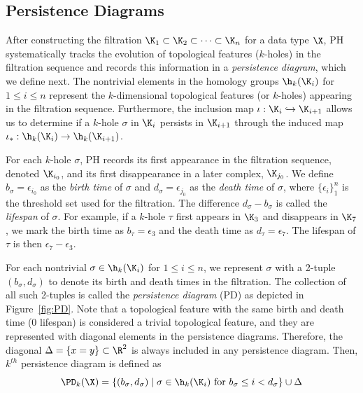  

\subsection{Persistence Diagrams} \label{sec:PD}

 
After constructing the filtration $\K_1 \subset \K_2 \subset \dots \subset \K_n$ for a data type $\X$, PH systematically tracks the evolution of topological features ($k$-holes) in the filtration sequence and records this information in a \textit{persistence diagram}, which we define next. The nontrivial elements in the homology groups $\h_k(\K_i)$ for $1\leq i\leq n$ represent the $k$-dimensional topological features (or $k$-holes) appearing in the filtration sequence. Furthermore, the inclusion map $\iota: \K_i \hookrightarrow \K_{i+1}$ allows us to determine if a $k$-hole $\sigma$ in $\K_i$ persists in $\K_{i+1}$ through the induced map $\iota_*: \h_k(\K_i) \to \h_k(\K_{i+1})$.



For each $k$-hole $\sigma$, PH records its first appearance in the filtration sequence, denoted $\K_{i_0}$, and its first disappearance in a later complex, $\K_{j_0}$. We define $b_\sigma = \epsilon_{i_0}$ as the \textit{birth time} of $\sigma$ and $d_\sigma = \epsilon_{j_0}$ as the \textit{death time} of $\sigma$, where $\{\epsilon_i\}_{1}^n$ is the threshold set used for the filtration. The difference $d_\sigma - b_\sigma$ is called the \textit{lifespan} of $\sigma$. For example, if a $k$-hole $\tau$ first appears in $\K_3$ and disappears in $\K_7$, we mark the birth time as $b_\tau = \epsilon_3$ and the death time as $d_\tau = \epsilon_7$. The lifespan of $\tau$ is then $\epsilon_7 - \epsilon_3$.

 
 



 


For each nontrivial $\sigma \in \h_k(\K_i)$ for $1 \leq i \leq n$, we represent $\sigma$ with a 2-tuple $(b_\sigma, d_\sigma)$ to denote its birth and death times in the filtration. The collection of all such 2-tuples is called the \textit{persistence diagram} (PD) as depicted in Figure~\ref{fig:PD}. Note that a topological feature with the same birth and death time ($0$ lifespan) is considered a trivial topological feature, and they are represented with diagonal elements in the persistence diagrams. Therefore, the diagonal $\Delta=\{x=y\}\subset \R^2$ is always included in any persistence diagram. %
Then, $k^{th}$ persistence diagram is defined as
$$\PD_k(\X)=\{(b_\sigma, d_\sigma) \mid \sigma \in \h_k(\K_i) \text{ for } b_\sigma \leq i < d_\sigma\}\cup \Delta$$

